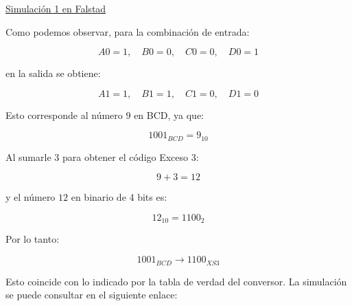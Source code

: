 \documentclass[a4paper,12pt]{article}
\begin{document}
\begin{center}
	\href{\detokenize{https://www.falstad.com/circuit/circuitjs.html?ctz=DwYwlgTgBAZgvAIgIwKgFwM6IAwDpsEECsqYIiSeATAVQOx0DM2AHFQGwCcndqIARoiLZUAB0EIALI1QA3CENQBbTEICmAWiQoAfACgoUYAEkoAD0Ra67KJJZQrNpJMmp4CEVAwAbHLhJQABZgigD0+oYm5pYs2Lb2GrFQzq6wOKg+fgHBYRFGphbINnbJTi5u6V6+Hv6oOQgk4Qb50QicxfbtyeVpHhnVeNkhDQhNkQCCAHYAJq2MRFRQVJJxkuySSysVfWNGU7OFzBtESIvSiydU254A9rnNwPutSOyrBEt0ZwTXpJOIMrtgAB5aCFJDWJbLKCMGiQ1LuW73SIg56vKALez0C5UFg-KB3EaAlGFSRdSQvKDrVYvPEExp5YGgxCkmxUIg2djspbs2lIowAGVajniDnBNk8CLEFFGDMFhUSqwSSQl6UBcooHVKUBVO1lrTJnXFeNE0sBAFlWpzWVymNb2D9zZaVrYKbaXfbeiJHYVXvYiC4oG7-fDVQyLT7WJTnW6qQ6GQB3fWa9bxOMPRM+jYlFM0XGemXpp1LSNi4t5yWAjMakVaDppyJVhC1msU5Y6r0JoWt52ltv1oyNmFxKhQ+aLEch3WFkk550szbtgsNoVJEpaU6p-OVrsbtfacc8red+X77k2dfjljl0PTyynnH2MdLK-94CDhZn6Efh+vxvCte5puFbHpYgEAZGQ6-kKgFDrYXSQUet5SF0WJwTYCHAUhLxxIwLAbBo8F4VBJ4bg+oobrhk4dkhF7QnhDiEVRS4Dqi3QbBS5Iephy5gsUFLYe6xGIF0KRQGS3yITxwnFO8AkrIu26FKh8lobYEncSxJIwuiu7aS415TlJUh6SU5y2DCQnGWcelkhZkmaYgqEYtC2DHDillHKpbLFO0lneV5XJ2ApIEIP5QWfmsTGKRqcTsFe2qUi+9lvl2HLxbFSUaSlhyuZSnzxLFnyWeF7D5eFwbFUkwY6RcPRZX+SSiQqth2JZzX6RFrXJY2YUlGF6yvmYXYsJwDiMIwopohoMj5l4wzLKgaBqIg4zYAAOpMzHAEN8pdNNSAOKVop4hg82pEtiAAELrZtgI7aBY0TTiY0nWdi3LQgADCN1bfdCB0KN00TZQgMzZKc2OedH0ACI-XdrR0EQ9jrEQgbxaVATg6dkPvYg0NIBtv0I0Qo3+vYdAjeiJyvTj6AfZ9KDw4U1hZlQE0AxNkhEGDlTY6FUNXQTt0Mn91hPew7OcOOnA830EP87jCDjELW2NimVqlLFh71al6IBgJFXdaicSXFGNWWTmkYppcFvHBu6vazeRmm1SNWBgsbXdnEzaGzrJ42NVzZxQZ1GRAAGpMNxMkUhWLJ5pVXEbhSm9Vvp61FIUu86aexkn0lqXEXS2pZpuI4sRce3nbQ2G6FeJ5hwChOAED6EAA}}{Simulación 1 en Falstad}
\end{center}
Como podemos observar, para la combinación de entrada:

\[
A0 = 1,\quad B0 = 0,\quad C0 = 0,\quad D0 = 1
\]

en la salida se obtiene:

\[
A1 = 1,\quad B1 = 1,\quad C1 = 0,\quad D1 = 0
\]

Esto corresponde al número $9$ en BCD, ya que:

\[
1001_{BCD} = 9_{10}
\]

Al sumarle $3$ para obtener el código Exceso 3:

\[
9 + 3 = 12
\]

y el número $12$ en binario de 4 bits es:

\[
12_{10} = 1100_2
\]

Por lo tanto:

\[
1001_{BCD} \rightarrow 1100_{XS3}
\]

Esto coincide con lo indicado por la tabla de verdad del conversor. La simulación se puede consultar en el siguiente enlace:
\end{document}
